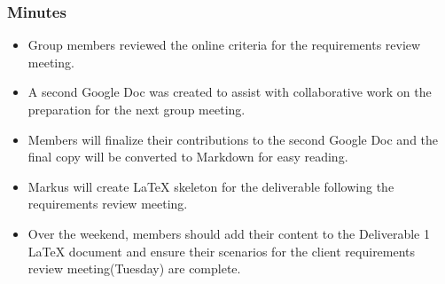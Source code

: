 \documentclass{article}
\begin{document}
\subsubsection{Minutes}
\begin{itemize}
\item Group members reviewed the online criteria for the requirements 
review meeting.
\item A second Google Doc was created to assist with collaborative work 
on the preparation for the next group meeting.
\item Members will finalize their contributions to the second Google Doc 
and the final copy will be converted to Markdown for easy reading.
\item Markus will create LaTeX skeleton for the deliverable following the 
requirements review meeting.
\item Over the weekend, members should add their content to the Deliverable
 1 LaTeX document and ensure their scenarios for the client requirements 
 review meeting(Tuesday) are complete.
\end{itemize}
\end{document}
